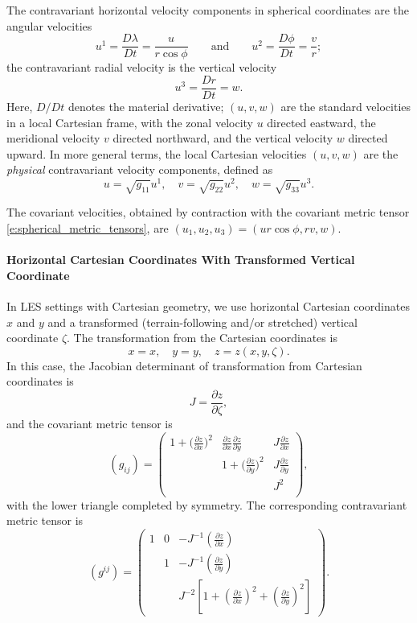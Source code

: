 \documentclass{report}
\begin{document}
The contravariant horizontal velocity components in spherical coordinates are the angular velocities 
\begin{equation}\label{e:angular_velocities}
u^1 = \frac{D\lambda}{Dt} = \frac{u}{r \cos\phi} \qquad \text{and} \qquad u^2 = \frac{D\phi}{Dt} = \frac{v}{r};
\end{equation}
the contravariant radial velocity is the vertical velocity 
\[
u^3 = \frac{Dr}{Dt} = w.
\]
Here, $D/Dt$ denotes the material derivative; $(u, v, w)$ are the standard velocities in a local Cartesian frame, with the zonal velocity $u$ directed eastward, the meridional velocity $v$ directed northward, and the vertical velocity $w$ directed upward. In more general terms, the local Cartesian velocities  $(u, v, w)$ are the \emph{physical} contravariant velocity components, defined as
\[
u = \sqrt{g_{11}} u^1, \quad v =\sqrt{g_{22}} u^2, \quad w =\sqrt{g_{33}} u^3.
\]

The covariant velocities, obtained by contraction with the covariant metric tensor \eqref{e:spherical_metric_tensors}, are $(u_1, u_2, u_3) = (u r \cos\phi, r v, w)$.

\paragraph{Horizontal Cartesian Coordinates With Transformed Vertical Coordinate} In LES settings with Cartesian geometry, we use horizontal Cartesian coordinates $x$ and $y$ and a transformed (terrain-following and/or stretched) vertical coordinate $\zeta$. 
The transformation from the Cartesian coordinates is
\[
x = x, \quad y = y, \quad z = z(x, y, \zeta).
\]
In this case, the Jacobian determinant of transformation from Cartesian coordinates is 
\[
J = \frac{\partial z}{\partial\zeta},
\]
and the covariant metric tensor is \citep{Guerra16a}
\begin{equation}\label{e:Cartesian_terrain_cov_metric}
    (g_{ij}) = \left(
    \begin{matrix}
    1 + \big(\frac{\partial z}{\partial x}\big)^{2} & 
    \frac{\partial z}{\partial x} \frac{\partial z}{\partial y} & 
    J \frac{\partial z}{\partial x}  \\
    & 
    1 + \big(\frac{\partial z}{\partial y}\big)^{2} 
    & J \frac{\partial z}{\partial y}  \\
     &
     & 
     J^2\\
    \end{matrix}
    \right),
\end{equation}
with the lower triangle completed by symmetry. The corresponding contravariant metric tensor is
\begin{equation}
    (g^{ij}) = \left(
    \begin{matrix}
    1 & 0 & - J^{-1} \left( \frac{\partial z}{\partial x} \right) \\
      & 1 & - J^{-1} \left( \frac{\partial z}{\partial y} \right) \\
      & & J^{-2} 
      \left[ 1 + \left( \frac{\partial z}{\partial x} \right)^2 + \left( \frac{\partial z}{\partial y} \right)^2 \right]
    \end{matrix}
    \right).
\end{equation}
\end{document}
